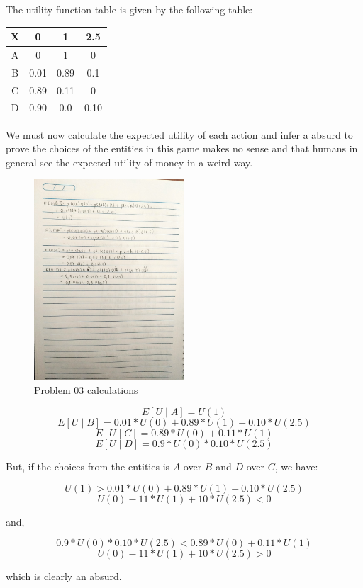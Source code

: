 \documentclass{article}
\begin{document}
\begin{enumerate}
	      The utility function table is given by the following table:

	      \bigskip
	      \begin{center}
		      \begin{tabular}{|c|c|c|c|}
			      \hline
			      X & 0    & 1    & 2.5  \\ \hline
			      A & 0    & 1    & 0    \\ \hline
			      B & 0.01 & 0.89 & 0.1  \\ \hline
			      C & 0.89 & 0.11 & 0    \\ \hline
			      D & 0.90 & 0.0  & 0.10 \\ \hline
		      \end{tabular}
	      \end{center}

	      We must now calculate the expected utility of each action and infer a absurd to prove the choices of the entities in this game makes no sense
	      and that humans in general see the expected utility of money in a weird way.

	      \begin{figure}[H]
		      \centering
		      \includegraphics[width=0.5\textwidth]{images/03.jpeg}
		      \caption{Problem 03 calculations}
	      \end{figure}

	      \[E[U \mid A] = U(1)\]
	      \[E[U \mid B] = 0.01*U(0) + 0.89*U(1) + 0.10*U(2.5)\]
	      \[E[U \mid C] = 0.89*U(0) + 0.11*U(1)\]
	      \[E[U \mid D] = 0.9*U(0) * 0.10*U(2.5)\]

	      But, if the choices from the entities is \(A\) over \(B\) and \(D\) over \(C\), we have:

	      \[U(1) > 0.01*U(0) + 0.89*U(1) + 0.10*U(2.5)\]
	      \[U(0) - 11*U(1) + 10*U(2.5) < 0\]

	      and,

	      \[0.9*U(0) * 0.10*U(2.5) < 0.89*U(0) + 0.11*U(1)\]
	      \[U(0) - 11*U(1) + 10*U(2.5) > 0\]

	      which is clearly an absurd.
\end{enumerate}


\nocite{*}
\end{document}
